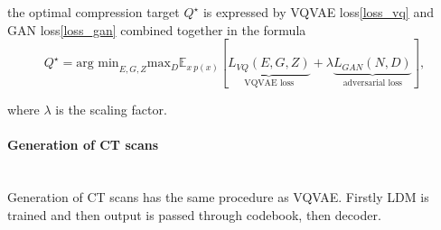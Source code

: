 the optimal compression target $Q^{\star}$ is expressed by VQVAE loss\eqref{loss_vq} and GAN loss\eqref{loss_gan} combined together in the formula
\begin{equation}
    Q^{\star} = \text{arg min}_{E,G,Z} \text{max}_D \mathbb{E}_{x~p(x)} [\underbrace{L_{VQ}(E, G, Z)}_{\text{VQVAE loss}} + \lambda\underbrace{L_{GAN}(N, D)}_{\text{adversarial loss}}],
\end{equation}

where $\lambda$ is the scaling factor.



\paragraph{Generation of CT scans}\mbox{}\\
\indent Generation of CT scans has the same procedure as VQVAE. Firstly LDM is trained and then output is passed through codebook, then decoder. 



